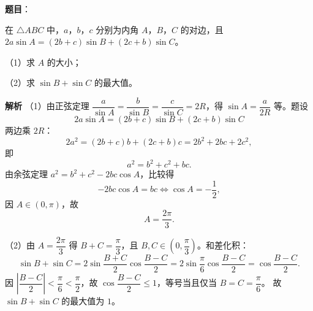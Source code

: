 \begin{answer}

\textbf{题目}：

在 $\triangle ABC$ 中，$a$，$b$，$c$ 分别为内角 $A$，$B$，$C$ 的对边，且 $2a\sin A=(2b+c)\sin B+(2c+b)\sin C$。

（1）求 $A$ 的大小；

（2）求 $\sin B+\sin C$ 的最大值。

\textbf{解析}
（1）由正弦定理 $\dfrac{a}{\sin A}=\dfrac{b}{\sin B}=\dfrac{c}{\sin C}=2R$，得 $\sin A=\dfrac{a}{2R}$ 等。题设
\nopagebreak[4]
\[2a\sin A=(2b+c)\sin B+(2c+b)\sin C\]
两边乘 $2R$：
\nopagebreak[4]
\[2a^2=(2b+c)b+(2c+b)c=2b^2+2bc+2c^2,\]
即
\nopagebreak[4]
\[a^2=b^2+c^2+bc.\]
由余弦定理 $a^2=b^2+c^2-2bc\cos A$，比较得
\nopagebreak[4]
\[-2bc\cos A=bc\iff\cos A=-\frac12,\]
因 $A\in(0,\pi)$，故
\nopagebreak[4]
\[A=\frac{2\pi}{3}.\]

（2）由 $A=\dfrac{2\pi}{3}$ 得 $B+C=\dfrac\pi3$，且 $B,C\in\left(0,\dfrac\pi3\right)$。和差化积：
\nopagebreak[4]
\[\sin B+\sin C=2\sin\frac{B+C}{2}\cos\frac{B-C}{2}
=2\sin\frac{\pi}{6}\cos\frac{B-C}{2}=\cos\frac{B-C}{2}.\]
因 $\left|\dfrac{B-C}{2}\right|<\dfrac{\pi}{6}<\dfrac{\pi}{2}$，故 $\cos\dfrac{B-C}{2}\leqslant1$，等号当且仅当 $B=C=\dfrac{\pi}{6}$。
故 $\sin B+\sin C$ 的最大值为 $1$。


\end{answer}
